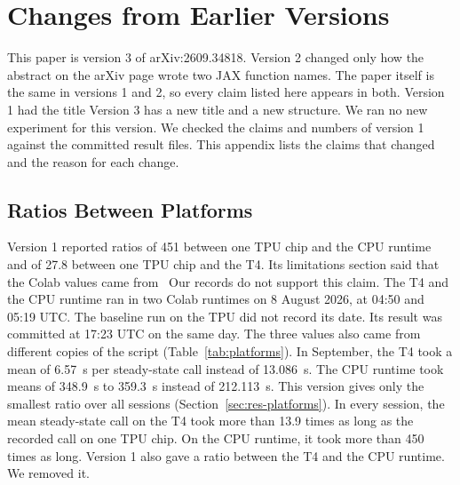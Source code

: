 \section{Changes from Earlier Versions}\label{app:changes}
This paper is version 3 of arXiv:2609.34818. Version 2 changed only how the abstract on the arXiv page wrote two JAX
function names. The paper itself is the same in versions 1 and 2, so every claim listed here appears in both. %
Version 1 had the title  Version 3
has a new title and a new structure.
We ran no new experiment for this version. We checked the claims and numbers of
version 1 against the committed result files. This appendix lists the claims that changed and the reason for each
change.

\subsection*{Ratios Between Platforms}
Version 1 reported ratios of 451 between one TPU chip and the CPU runtime and of 27.8 between one TPU chip and the T4. %
Its limitations section said that the Colab values came from \ Our records do not support this claim.
The T4 and the CPU runtime ran in two Colab runtimes on 8 August 2026, at 04:50 and 05:19 UTC. %
The baseline run on the TPU did not record its date. Its result was committed at 17:23 UTC on the same day. %
The three values also came from different copies of the script (Table~\ref{tab:platforms}).
In September, the T4 took a mean of 6.57~s per steady-state call instead of 13.086~s. %
The CPU runtime took means of 348.9~s to 359.3~s instead of 212.113~s. %
This version gives only the smallest ratio over all sessions (Section~\ref{sec:res-platforms}).
In every session, the mean steady-state call on the T4 took more than 13.9 times as long as the recorded call on one TPU chip. %
On the CPU runtime, it took more than 450 times as long. %
Version 1 also gave a ratio between the T4 and the CPU runtime. We removed it.

